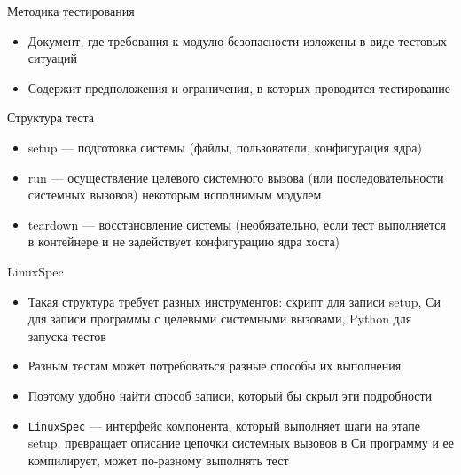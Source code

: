 \documentclass[hyperref={unicode=true}]{beamer}
\begin{document}
    \begin{frame}{Методика тестирования}
    \begin{itemize}
    \item Документ, где требования к модулю безопасности изложены
        в виде тестовых ситуаций
    \item Содержит предположения и ограничения, в которых проводится
        тестирование
    \end{itemize}
    \end{frame}

    \begin{frame}{Структура теста}
    \begin{itemize}
    \item setup --- подготовка системы (файлы, пользователи, конфигурация ядра)
    \item run --- осуществление целевого системного вызова (или последовательности
                    системных вызовов) некоторым исполнимым модулем
    \item teardown --- восстановление системы (необязательно, если тест выполняется
            в контейнере и не задействует конфигурацию ядра хоста)
    \end{itemize}
    \end{frame}

    \begin{frame}{LinuxSpec}
    \begin{itemize}
    \item Такая структура требует разных инструментов: скрипт для записи setup,
            Си для записи программы с целевыми системными вызовами, Python
            для запуска тестов
    \item Разным тестам может потребоваться разные способы их выполнения
    \item Поэтому удобно найти способ записи, который бы скрыл эти подробности
    \item \texttt{LinuxSpec} --- интерфейс компонента, который выполняет шаги
        на этапе setup, превращает описание цепочки системных вызовов в Си
        программу и ее компилирует, может по-разному выполнять тест
    \end{itemize}
    \end{frame}
\end{document}
